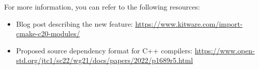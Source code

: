 For more information, you can refer to the following resources:

\begin{itemize}
\item
Blog post describing the new feature: \url{https://www.kitware.com/import-cmake-c20-modules/}

\item
Proposed source dependency format for C++ compilers: \url{https://www.open-std.org/jtc1/sc22/wg21/docs/papers/2022/p1689r5.html}
\end{itemize}